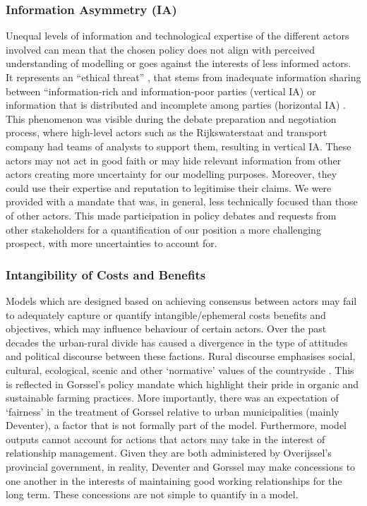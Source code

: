 \subsubsection{Information Asymmetry (IA)}
Unequal levels of information and technological expertise of the different actors involved can mean that the chosen policy does not align with perceived understanding of modelling or goes against the interests of less informed actors. It represents an “ethical threat” \parencite{albertus_impact_2019}, that stems from inadequate information sharing between “information-rich and information-poor parties (vertical IA) or information that is distributed and incomplete among parties (horizontal IA) \parencite{clarkson_information_2007}. This phenomenon was visible during the debate preparation and negotiation process, where high-level actors such as the Rijkswaterstaat and transport company had teams of analysts to support them, resulting in vertical IA. These actors may not act in good faith or may hide relevant information from other actors creating more uncertainty for our modelling purposes. Moreover, they could use their expertise and reputation to legitimise their claims. We were provided with a mandate that was, in general, less technically focused than those of other actors. This made participation in policy debates and requests from other stakeholders for a quantification of our position a more challenging prospect, with more uncertainties to account for. 

\subsubsection{Intangibility of Costs and Benefits}
Models which are designed based on achieving consensus between actors may fail to adequately capture or quantify intangible/ephemeral costs benefits and objectives, which may influence behaviour of certain actors. Over the past decades the urban-rural divide has caused a divergence in the type of attitudes and political discourse between these factions. Rural discourse emphasises social, cultural, ecological, scenic and other ‘normative’ values of the countryside \parencite{frouws_contested_1998, andersson_beyond_2009}. This is reflected in Gorssel’s policy mandate which highlight their pride in organic and sustainable farming practices. More importantly, there was an expectation of ‘fairness’ in the treatment of Gorssel relative to urban municipalities (mainly Deventer), a factor that is not formally part of the model. Furthermore, model outputs cannot account for actions that actors may take in the interest of relationship management. Given they are both administered by Overijssel’s provincial government, in reality, Deventer and Gorssel may make concessions to one another in the interests of maintaining good working relationships for the long term. These concessions are not simple to quantify in a model. 

